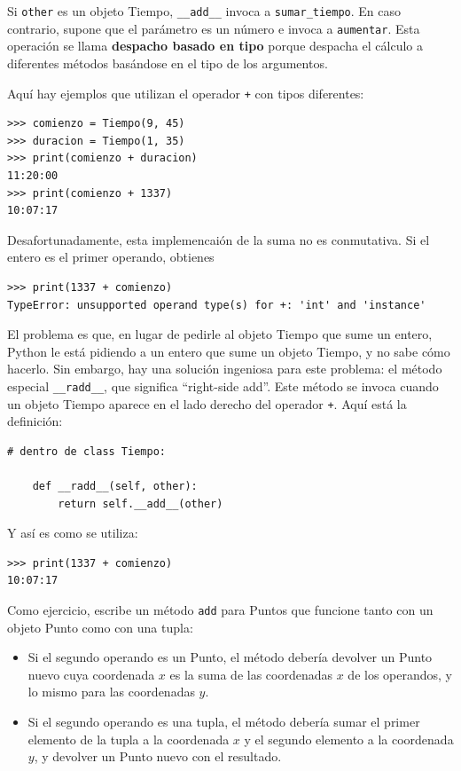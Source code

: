 \documentclass[10pt]{book}
\begin{document}
Si {\tt other} es un objeto Tiempo, \verb"__add__" invoca a
\verb"sumar_tiempo".  En caso contrario, supone que el parámetro
es un número e invoca a {\tt aumentar}.  Esta operación se
llama {\bf despacho basado en tipo} porque despacha el
cálculo a diferentes métodos basándose en el tipo de los
argumentos.

Aquí hay ejemplos que utilizan el operador {\tt +} con tipos
diferentes:

\begin{verbatim}
>>> comienzo = Tiempo(9, 45)
>>> duracion = Tiempo(1, 35)
>>> print(comienzo + duracion)
11:20:00
>>> print(comienzo + 1337)
10:07:17
\end{verbatim}
%
Desafortunadamente, esta implemencaión de la suma no es conmutativa.
Si el entero es el primer operando, obtienes

\begin{verbatim}
>>> print(1337 + comienzo)
TypeError: unsupported operand type(s) for +: 'int' and 'instance'
\end{verbatim}
%
El problema es que, en lugar de pedirle al objeto Tiempo que sume un entero,
Python le está pidiendo a un entero que sume un objeto Tiempo, y no sabe
cómo hacerlo.  Sin embargo, hay una solución ingeniosa para este problema: el
método especial \verb"__radd__", que significa ``right-side add''.
Este método se invoca cuando un objeto Tiempo aparece en el lado derecho del
operador {\tt +}.  Aquí está la definición:

\begin{verbatim}
# dentro de class Tiempo:

    def __radd__(self, other):
        return self.__add__(other)
\end{verbatim}
%
Y así es como se utiliza:

\begin{verbatim}
>>> print(1337 + comienzo)
10:07:17
\end{verbatim}
%

Como ejercicio, escribe un método {\tt add} para Puntos que funcione tanto con
un objeto Punto como con una tupla:

\begin{itemize}

\item Si el segundo operando es un Punto, el método debería devolver un
Punto nuevo cuya coordenada $x$ es la suma de las coordenadas $x$ de los
operandos, y lo mismo para las coordenadas $y$.

\item Si el segundo operando es una tupla, el método debería sumar el
primer elemento de la tupla a la coordenada $x$ y el segundo
elemento a la coordenada $y$, y devolver un Punto nuevo con el resultado.

\end{itemize}
\end{document}
